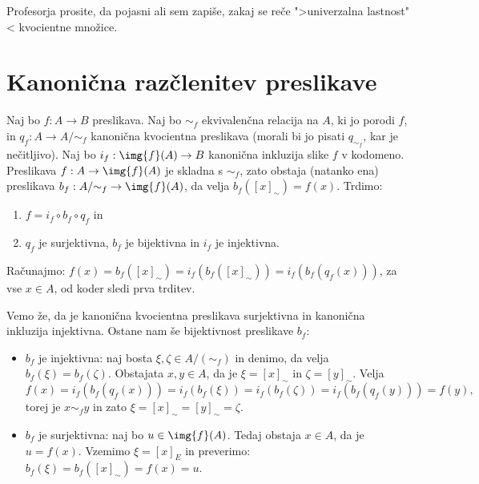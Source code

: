 \begin{opomba}
  Profesorja prosite, da pojasni ali sem zapiše, zakaj se reče ">univerzalna lastnost"< kvocientne množice.
\end{opomba}


\section{Kanonična razčlenitev preslikave}

Naj bo $f : A \to B$ preslikava. Naj bo $\sim_f$ ekvivalenčna relacija na $A$, ki jo porodi
$f$, in $q_f : A \to A/{\sim_f}$ kanonična kvocientna preslikava (morali bi jo pisati $q_{\sim_f}$,
kar je nečitljivo). Naj bo $i_f : \img{f}(A) \to B$ kanonična inkluzija slike $f$ v kodomeno.
Preslikava $f : A \to \img{f}(A)$ je skladna s $\sim_f$, zato obstaja (natanko ena) preslikava
$b_f : A/{\sim_f} \to \img{f}(A)$, da velja $b_f([x]_\sim) = f(x)$. Trdimo:
%
\begin{enumerate}
\item $f = i_f \circ b_f \circ q_f$ in
\item $q_f$ je surjektivna, $b_f$ je bijektivna in $i_f$ je injektivna.
\end{enumerate}
%
Računajmo: $f(x) = b_f([x]_\sim) = i_f(b_f([x]_\sim)) = i_f(b_f(q_f(x)))$, za vse $x \in A$, od
koder sledi prva trditev.

Vemo že, da je kanonična kvocientna preslikava surjektivna in kanonična inkluzija
injektivna. Ostane nam še bijektivnost preslikave $b_f$:
%
\begin{itemize}
\item $b_f$ je injektivna: naj bosta $\xi, \zeta \in A/(\sim_f)$ in denimo, da velja $b_f(\xi) = b_f(\zeta)$.
  Obstajata $x, y \in A$, da je $\xi = [x]_\sim$ in $\zeta = [y]_\sim$. Velja
  \begin{equation*}
    f(x) = i_f(b_f(q_f(x))) = i_f(b_f(\xi)) = i_f(b_f(\zeta)) = i_f(b_f(q_f(y))) = f(y),
  \end{equation*}
  torej je $x \sim_f y$ in zato $\xi = [x]_\sim = [y]_\sim = \zeta$.

  \item $b_f$ je surjektivna: naj bo $u \in \img{f}(A)$. Tedaj obstaja $x \in A$, da je $u = f(x)$.
  Vzemimo $\xi = [x]_E$ in preverimo: $b_f(\xi) = b_f([x]_\sim) =f(x) = u$.
\end{itemize}
